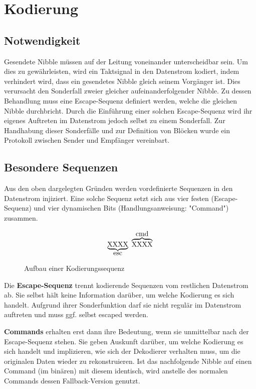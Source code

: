 \chapter{Kodierung}
\section{Notwendigkeit}
Gesendete Nibble müssen auf der Leitung voneinander unterscheidbar sein. Um dies zu gewährleisten, wird ein Taktsignal in den Datenstrom kodiert, indem verhindert wird, dass ein gesendetes Nibble gleich seinem Vorgänger ist. Dies verursacht den Sonderfall zweier gleicher aufeinanderfolgender Nibble. Zu dessen Behandlung muss eine Escape-Sequenz definiert werden, welche die gleichen Nibble durchbricht. Durch die Einführung einer solchen Escape-Sequenz wird ihr eigenes Auftreten im Datenstrom jedoch selbst zu einem Sonderfall. Zur Handhabung dieser Sonderfälle und zur Definition von Blöcken wurde ein Protokoll zwischen Sender und Empfänger vereinbart.

\section{Besondere Sequenzen}
Aus den oben dargelegten Gründen werden vordefinierte Sequenzen in den Datenstrom injiziert. Eine solche Sequenz setzt sich aus vier festen (Escape-Sequenz) und vier dynamischen Bits (Handlungsanweisung: "Command") zusammen.

\begin{figure}[H]
    \centering
    \[
        \underbrace{\text{XXXX}}_\text{\normalsize esc} \ \overbrace{\text{XXXX}}^\text{\normalsize cmd}
    \]
    \caption{Aufbau einer Kodierungssequenz}
\end{figure}

Die \textbf{Escape-Sequenz} trennt kodierende Sequenzen vom restlichen Datenstrom ab. Sie selbst hält keine Information darüber, um welche Kodierung es sich handelt. Aufgrund ihrer Sonderfunktion darf sie nicht regulär im Datenstrom auftreten und muss ggf. selbst escaped werden.

\textbf{Commands} erhalten erst dann ihre Bedeutung, wenn sie unmittelbar nach der Escape-Sequenz stehen. Sie geben Auskunft darüber, um welche Kodierung es sich handelt und implizieren, wie sich der Dekodierer verhalten muss, um die originalen Daten wieder zu rekonstruieren. Ist das nachfolgende Nibble auf einen Command (im binären) mit diesem identisch, wird anstelle des normalen Commands dessen Fallback-Version genutzt.

